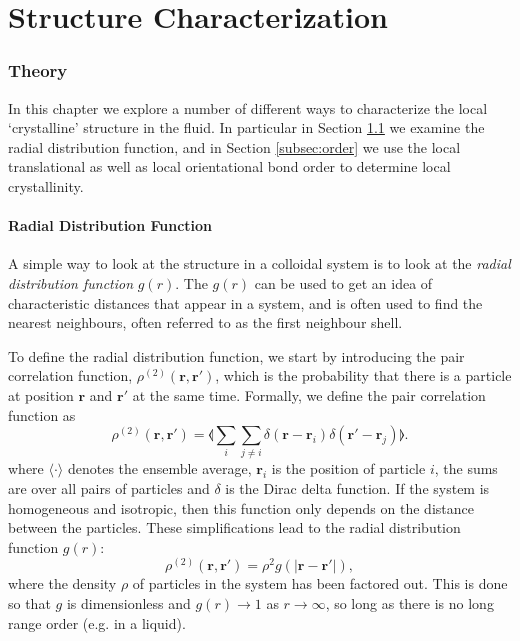 \documentclass[thesis]{subfiles}
\begin{document}
\newpage

\part{Structure Characterization}
\section{Theory}

In this chapter we explore a number of different ways to characterize the local `crystalline' structure in the fluid. In particular in Section \ref{subsec:rdf} we examine the radial distribution function, and in Section \ref{subsec:order} we use the local translational as well as local orientational bond order to determine local crystallinity.

\subsection{Radial Distribution Function} \label{subsec:rdf}

A simple way to look at the structure in a colloidal system is to look at the \emph{radial distribution function} $g(r)$.  The $g(r)$ can be used to get an idea of characteristic distances that appear in a system, and is often used to find the nearest neighbours, often referred to as the first neighbour shell. 

To define the radial distribution function, we start by introducing the pair correlation function, 
 $\rho^{(2)}(\bm r, \bm r')$,  which is the probability that there is a particle at position $\bm r$ and $\bm r'$ at the same time. Formally, we define the pair correlation function as 
\begin{equation}
\rho^{(2)}(\bm r, \bm r') = \llangle \sum_i \sum_{j \neq i} \delta(\bm r - \bm r_i) \delta(\bm r' - \bm r_j) \rrangle.
\end{equation}
where $\langle \cdot \rangle$ denotes the ensemble average, $\bm r_i$ is the position of particle $i$, the sums are over all pairs of particles and $\delta$ is the Dirac delta function.
If the system is homogeneous and isotropic, then this function only depends on the distance between the particles. These simplifications lead to the radial distribution function $g(r)$:
\begin{equation}
\rho^{(2)}(\bm r, \bm r') = \rho^2 g(|\bm r - \bm r'|), \label{eq:gofr}
\end{equation}
where the density $\rho$ of particles in the system has been factored out. This is done so that $g$ is dimensionless and $g(r) \rightarrow 1$ as $r \rightarrow \infty$, so long as there is no long range order (e.g. in a liquid).
\end{document}

